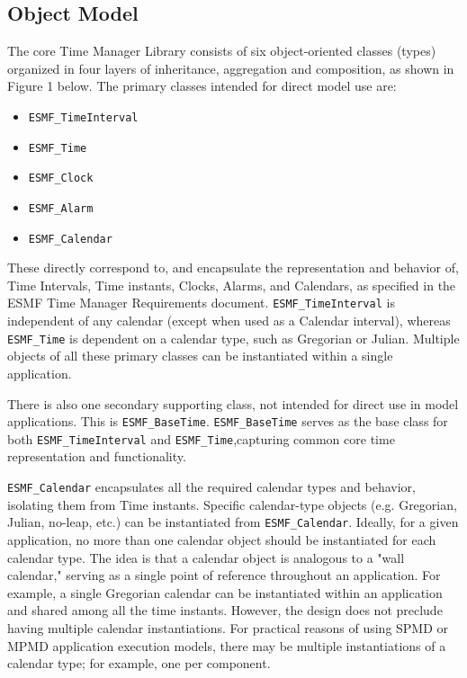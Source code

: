 
\subsection{Object Model}

The core Time Manager Library consists of six object-oriented classes (types)
organized in four layers of inheritance, aggregation and composition,
as shown in Figure 1 below.  The primary classes intended for
direct model use are:

\begin{itemize}
\item {\tt ESMF\_TimeInterval}
\item {\tt ESMF\_Time}
\item {\tt ESMF\_Clock}
\item {\tt ESMF\_Alarm}
\item {\tt ESMF\_Calendar}
\end{itemize}

These directly correspond to, and encapsulate the representation and
behavior of, Time Intervals, Time instants, Clocks, Alarms, and Calendars,
as specified in the ESMF Time Manager Requirements document.
{\tt ESMF\_TimeInterval} is independent of any calendar (except when used
as a Calendar interval), whereas {\tt ESMF\_Time} is dependent on a calendar
type, such as Gregorian or Julian.  Multiple objects of all these primary
classes can be instantiated within a single application.

There is also one secondary supporting class, not intended for direct
use in model applications.  This is {\tt ESMF\_BaseTime}.  {\tt ESMF\_BaseTime}
serves as the base class for both {\tt ESMF\_TimeInterval} and
{\tt ESMF\_Time},capturing common core time representation and functionality.

{\tt ESMF\_Calendar} encapsulates all the required calendar types and behavior,
isolating them from Time instants.  Specific calendar-type objects (e.g.
Gregorian, Julian, no-leap, etc.) can be instantiated from {\tt ESMF\_Calendar}.
Ideally, for a given application, no more than one calendar
object should be instantiated for each calendar type.  The idea is that
a calendar object is analogous to a "wall calendar," serving as a single
point of reference throughout an application.  For example, a single
Gregorian calendar can be instantiated within an application and shared
among all the time instants.  However, the design does not preclude having
multiple calendar instantiations.  For practical reasons of using SPMD or
MPMD application execution models, there may be multiple instantiations
of a calendar type; for example, one per component.

